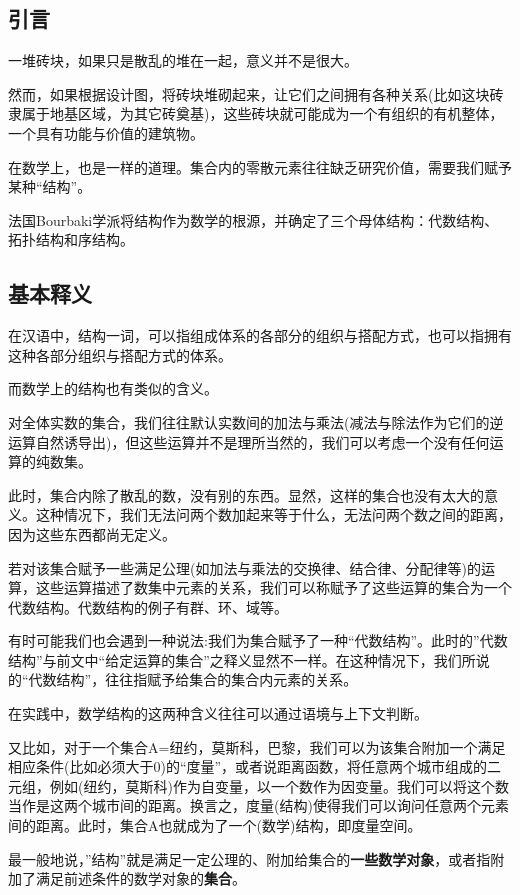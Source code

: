 

\subsection{引言}
一堆砖块，如果只是散乱的堆在一起，意义并不是很大。

然而，如果根据设计图，将砖块堆砌起来，让它们之间拥有各种关系(比如这块砖隶属于地基区域，为其它砖奠基)，这些砖块就可能成为一个有组织的有机整体，一个具有功能与价值的建筑物。

在数学上，也是一样的道理。集合内的零散元素往往缺乏研究价值，需要我们赋予某种“结构”。

法国Bourbaki学派将结构作为数学的根源，并确定了三个母体结构：代数结构、拓扑结构和序结构。

\subsection{基本释义}
在汉语中，结构一词，可以指组成体系的各部分的组织与搭配方式，也可以指拥有这种各部分组织与搭配方式的体系。

而数学上的结构也有类似的含义。

对全体实数的集合，我们往往默认实数间的加法与乘法(减法与除法作为它们的逆运算自然诱导出)，但这些运算并不是理所当然的，我们可以考虑一个没有任何运算的纯数集。

此时，集合内除了散乱的数，没有别的东西。显然，这样的集合也没有太大的意义。这种情况下，我们无法问两个数加起来等于什么，无法问两个数之间的距离，因为这些东西都尚无定义。 

若对该集合赋予一些满足公理(如加法与乘法的交换律、结合律、分配律等)的运算，这些运算描述了数集中元素的关系，我们可以称赋予了这些运算的集合为一个代数结构。代数结构的例子有群、环、域等。

有时可能我们也会遇到一种说法:我们为集合赋予了一种“代数结构”。此时的”代数结构”与前文中“给定运算的集合”之释义显然不一样。在这种情况下，我们所说的“代数结构”，往往指赋予给集合的集合内元素的关系。

在实践中，数学结构的这两种含义往往可以通过语境与上下文判断。

又比如，对于一个集合A={纽约，莫斯科，巴黎}，我们可以为该集合附加一个满足相应条件(比如必须大于0)的“度量”，或者说距离函数，将任意两个城市组成的二元组，例如(纽约，莫斯科)作为自变量，以一个数作为因变量。我们可以将这个数当作是这两个城市间的距离。换言之，度量(结构)使得我们可以询问任意两个元素间的距离。此时，集合A也就成为了一个(数学)结构，即度量空间。

最一般地说，”结构”就是满足一定公理的、附加给集合的\textbf{一些数学对象}，或者指附加了满足前述条件的数学对象的\textbf{集合}。

